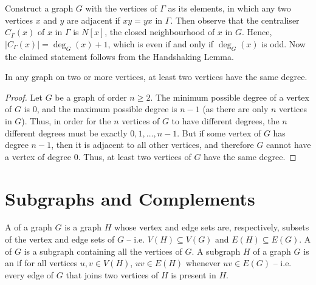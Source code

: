 \begin{Solution*}
Construct a graph $G$ with the vertices of $\Gamma$ as its elements, in which any two vertices $x$ and $y$ are adjacent if $xy = yx$ in $\Gamma$. Then observe that the centraliser $C_\Gamma(x)$ of $x$ in $\Gamma$ is $N[x]$, the closed neighbourhood of $x$ in $G$. Hence, $|C_\Gamma(x)| = \deg_G(x) + 1$, which is even if and only if $\deg_G(x)$ is odd. Now the claimed statement follows from the Handshaking Lemma.
\end{Solution*}

\begin{Theorem}
In any graph on two or more vertices, at least two vertices have the same degree.
\end{Theorem}

\begin{proof}
Let $G$ be a graph of order $n \ge 2$. The minimum possible degree of a vertex of $G$ is $0$, and the maximum possible degree is $n - 1$ (as there are only $n$ vertices in $G$). Thus, in order for the $n$ vertices of $G$ to have different degrees, the $n$ different degrees must be exactly $0, 1, \ldots, n - 1$. But if some vertex of $G$ has degree $n - 1$, then it is adjacent to all other vertices, and therefore $G$ cannot have a vertex of degree $0$. Thus, at least two vertices of $G$ have the same degree.
\end{proof}


\section{Subgraphs and Complements}\label{sec:Subgraphs}

A  of a graph $G$ is a graph $H$ whose vertex and edge sets are, respectively, subsets of the vertex and edge sets of $G$ -- i.e. $V(H) \subseteq V(G)$ and $E(H) \subseteq E(G)$. A  of $G$ is a subgraph containing all the vertices of $G$. A subgraph $H$ of a graph $G$ is an  if for all vertices $u, v \in V(H)$, $uv \in E(H)$ whenever $uv \in E(G)$ -- i.e. every edge of $G$ that joins two vertices of $H$ is present in $H$.

